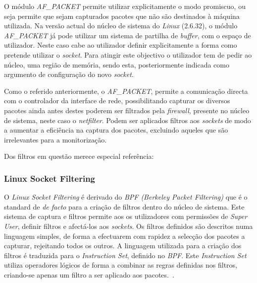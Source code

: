 O módulo \textit{AF\_PACKET} permite utilizar explicitamente o modo promiscuo, ou seja permite que sejam capturados pacotes que não são destinados à máquina utilizada.
Na versão actual do núcleo de sistema do \textit{Linux} (2.6.32), o módulo \textit{AF\_PACKET} já pode utilizar um sistema de partilha de \textit{buffer}, com o espaço de utilizador.
Neste caso cabe ao utilizador definir explicitamente a forma como pretende utilizar o \textit{socket}. 
Para atingir este objectivo o utilizador tem de pedir ao núcleo, uma região de memória, sendo esta, posteriormente indicada como argumento de configuração do novo \textit{socket}.

Como o referido anteriormente, o \textit{AF\_PACKET}, permite a comunicação directa com o controlador da interface de rede, possibilitando capturar os diversos pacotes ainda antes destes poderem ser filtrados pela \textit{firewall}, presente no núcleo de sistema, neste caso o \textit{netfilter}.
Podem ser aplicados filtros aos \textit{sockets} de modo a aumentar a eficiência na captura dos pacotes, excluindo aqueles que são irrelevantes para a monitorização.

Dos filtros em questão merece especial referência:

\subsubsection{Linux Socket Filtering}
O \textit{Linux Socket Filtering} é derivado do \textit{BPF (Berkeley Packet Filtering)} que é o standard de \textit{de facto} para a criação de filtros dentro do núcleo de sistema. 
Este sistema de captura e filtros permite aos os utilizadores com permissões de \textit{Super User}, definir filtros e afectá-los aos \textit{sockets}.
Os filtros definidos são descritos numa linguagem simples, de forma a efectuarem com rapidez a selecção dos pacotes a capturar, rejeitando todos os outros.
A linguagem utilizada para a criação dos filtros é traduzida para o \textit{Instruction Set}, definido no \textit{BPF}.
Este \textit{Instruction Set} utiliza operadores lógicos de forma a combinar as regras definidas nos filtros, criando-se apenas um filtro a ser aplicado aos pacotes.~\cite{Mccanne92thebsd}.

